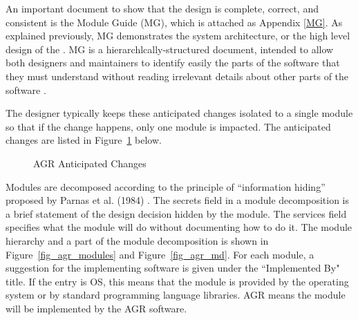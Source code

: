 An important document to show that the design is complete, correct, and consistent is the Module Guide (MG), which is attached as Appendix \ref{MG}. As explained previously, MG demonstrates the system architecture, or the high level design of the \progname{}. MG is a hierarchlcally-structured document, intended to allow both designers and maintainers to identify easily the parts of the software that they must understand without reading irrelevant details about other parts of the software \cite{ParnasEtAl1984}. 

The designer typically keeps these anticipated changes isolated to a single module so that if the change happens, only one module is impacted. The anticipated changes are listed in Figure~\ref{fig_agr_ac} below.

\begin{figure}[H]
    \centering
    \caption[AGR Anticipated Changes]{AGR Anticipated Changes}
    \label{fig_agr_ac}
\end{figure}

Modules are decomposed according to the principle of “information hiding” proposed by Parnas et al. (1984) \citep{ParnasEtAl1984}. The secrets field in a module decomposition is a brief statement of the design decision hidden by the module. The services field specifies what the module will do without documenting how to do it. The module hierarchy and a part of the module decomposition is shown in Figure~\ref{fig_agr_modules} and Figure~\ref{fig_agr_md}. For each module, a suggestion for the implementing software is given under the ``Implemented By" title. If the entry is OS, this means that the module is provided by the operating system or by standard programming language libraries. AGR means the module will be implemented by the AGR software.

